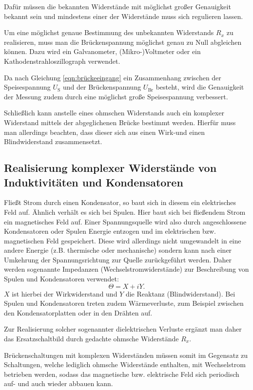 Dafür müssen die bekannten Widerstände mit möglichst großer Genauigkeit bekannt sein und mindestens einer der Widerstände muss sich regulieren lassen.

Um eine möglichst genaue Bestimmung des unbekannten Widerstands $R_x$ zu realisieren, muss man die Brückenspannung möglichst genau zu Null abgleichen können.
Dazu wird ein Galvanometer, (Mikro-)Voltmeter oder ein Kathodenstrahloszillograph verwendet.

Da nach Gleichung \eqref{eqn:brückeeingang} ein Zusammenhang zwischen der Speisespannung $U_{\text{S}}$ und der Brückenspannung $U_{\text{Br}}$ besteht, wird die Genauigkeit der Messung zudem durch eine möglichst große Speisespannung verbessert.

Schließlich kann anstelle eines ohmschen Widerstands auch ein komplexer Widerstand mittels der abgeglichenen Brücke bestimmt werden. Hierfür muss man allerdings beachten, dass dieser sich aus einen Wirk-und einen Blindwiderstand zusammensetzt.

\subsection{Realisierung komplexer Widerstände von Induktivitäten und Kondensatoren}
\label{sec:komplexewiderstände}
Fließt Strom durch einen Kondensator, so baut sich in diesem ein elektrisches Feld auf. Ähnlich verhält es sich bei Spulen. Hier baut sich bei fließendem Strom ein magnetisches Feld auf.
Einer Spannungsquelle wird also durch angeschlossene Kondensatoren oder Spulen Energie entzogen und im elektrischen bzw. magnetischen Feld gespeichert. Diese wird allerdings nicht umgewandelt in eine andere Energie (z.B. thermische oder mechanische) sondern kann nach einer Umkehrung der Spannungsrichtung zur Quelle zurückgeführt werden.
Daher werden sogenannte Impedanzen (Wechselstromwiderstände) zur Beschreibung von Spulen und Kondensatoren verwendet:
\begin{equation}
\Theta= X+iY \text{.}
\end{equation}
$X$ ist hierbei der Wirkwiderstand und $Y$ die Reaktanz (Blindwiderstand).
Bei Spulen und Kondensatoren treten zudem Wärmeverluste, zum Beispiel zwischen den Kondensatorplatten
oder in den Drähten auf.

Zur Realisierung solcher sogenannter dielektrischen Verluste
ergänzt man daher das Ersatzschaltbild durch gedachte ohmsche Widerstände $R_x$.

Brückenschaltungen mit komplexen Widerständen müssen somit im Gegensatz zu Schaltungen, welche lediglich ohmsche Widerstände enthalten, mit Wechselstrom betrieben werden, sodass das magnetische bzw. elektrische Feld sich periodisch auf- und auch wieder abbauen kann.

